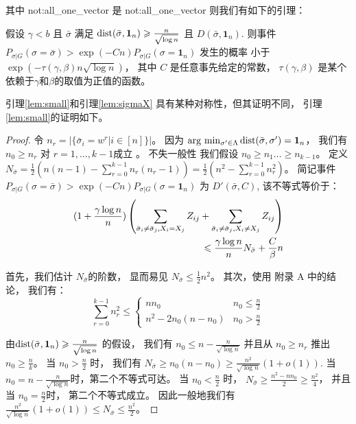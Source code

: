 其中 \gls{not:all_one_vector} 是 \glsdesc{not:all_one_vector} %
则我们有如下的引理：
 \begin{lemma}\label{lem:small}
	假设 $\gamma < b $ 且 $\bar{\sigma}$
  满足 
  $\Dist(\bar{\sigma}, \mathbf{1}_n) \geq \frac{n}{\sqrt{\log  n}}$
	且 $D(\bar{\sigma}, \mathbf{1}_n)$.
	则事件
	$P_{\sigma | G}(\sigma = \bar{\sigma} ) > \exp(-Cn) P_{\sigma | G}(\sigma = \mathbf{1}_n)$
	发生的概率 小于 $\exp(-\tau(\gamma,\beta) n \sqrt{\log  n} )$，
  其中 $C$ 是任意事先给定的常数，
  $\tau(\gamma,\beta)$ 是某个依赖于$\gamma$和$\beta$的取值为正值的函数。
\end{lemma}
引理\ref{lem:small}和引理\ref{lem:sigmaX} 具有某种对称性，但其证明不同，
引理\ref{lem:small}的证明如下。
\begin{proof}
	令 $n_r = |\{\bar{\sigma}_i = w^r | i\in [n] \}|$。
  因为 $\arg\,\min_{\sigma'\in \Lambda} \Dist(\bar{\sigma}, \sigma') = \mathbf{1}_n$，
  我们有 $n_0 \geq n_r$ 对 $r=1, \dots, k-1$成立 
  。
	不失一般性 我们假设 \mbox{$n_0 \geq n_1 \dots \geq n_{k-1}$}。
	定义
  $N_{\bar{\sigma}} = \frac{1}{2}(n(n-1) - \sum_{r=0}^{k-1} n_r(n_r-1))
	=\frac{1}{2}(n^2 - \sum_{r=0}^{k-1} n_r^2)$。
	简记事件
  $P_{\sigma | G}(\sigma = \bar{\sigma} ) > \exp(-Cn) P_{\sigma | G}(\sigma = \mathbf{1}_n)$ 为
  $D'(\bar{\sigma}, C)$,
	该不等式等价于：
\begin{align}
	(1 + \frac{\gamma \log n}{n})
	\left( \sum_{\bar{\sigma}_i  \neq \bar{\sigma}_j, X_i = X_j} Z_{ij} +
	\sum_{\bar{\sigma}_i  \neq \bar{\sigma}_j, X_i \neq X_j} Z_{ij} \right)\notag\\
	\leq \frac{\gamma \log n}{n} N_{\bar{\sigma}} + \frac{C}{\beta} n\label{eq:small}
\end{align}
		
	首先，我们估计 $N_{\bar{\sigma}}$的阶数，
  显而易见 $N_{\bar{\sigma}} \leq \frac{1}{2} n^2$。
	其次，使用 \citet{chen2016information} 附录 A 中的结论，
  我们有：
\begin{equation}
	\sum_{r=0}^{k-1} n_r^2 \leq
	\begin{cases}
	n n_0 & n_0 \leq \frac{n}{2} \\
	n^2 - 2n_0(n-n_0) & n_0 > \frac{n}{2}
	\end{cases}
	\end{equation}
	
	由$\Dist(\bar{\sigma}, \mathbf{1}_n) \geq \frac{n}{\sqrt{\log n}}$
  的假设，
  我们有 $n_0 \leq n - \frac{n}{\sqrt{\log n}}$
	并且从 $n_0 \geq n_r$ 推出 $n_0 \geq \frac{n}{k}$。
	当 $n_0 > \frac{n}{2}$ 时，
	我们有
  $N_{\bar{\sigma}} \geq n_0 (n - n_0) \geq \frac{n^2}{\sqrt{\log n}}(1+o(1))$.
	当 $n_0 = n - \frac{n}{\sqrt{\log n}}$时，第二个不等式可达。
  当 $n_0 < \frac{n}{2}$ 时，
	$N_{\bar{\sigma}} \geq \frac{n^2 - nn_0}{2} \geq \frac{n^2}{4}$，
  并且当 $n_0 = \frac{n}{2}$时，
  第二个不等式成立。
	因此一般地我们有 $\frac{n^2}{\sqrt{\log n}}(1+o(1)) \leq N_{\bar{\sigma}} \leq \frac{n^2}{2}$。
	

\end{proof}

